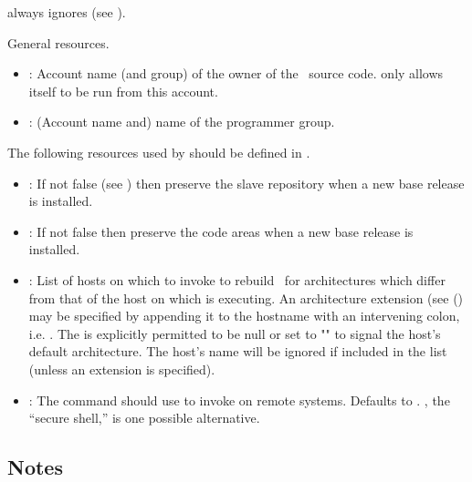  always ignores  (see ).

\noindent
General resources.

\begin{itemize}
\item
   : Account name (and group) of the owner of the
   \aipspp\ source code.   only allows itself to be run from this
   account.

\item
   : (Account name and) name of the \aipspp
   programmer group.
\end{itemize}

\noindent
The following resources used by  should be defined in
.

\begin{itemize}
\item
   : If not false (see ) then
   preserve the slave repository when a new base release is installed.

\item
   : If not false then preserve the code areas
   when a new base release is installed.

\item
   : List of hosts on which to invoke
    to rebuild \aipspp\ for architectures which differ from
   that of the host on which  is executing.  An architecture
   extension (see () may be specified by appending it to the
   hostname with an intervening colon, i.e. .
   The  is explicitly permitted to be null or set to
   "\code{\_}" to signal the host's default architecture.  The 
   host's name will be ignored if included in the list (unless an extension is
   specified).

\item
   : The command  should use
   to invoke  on remote systems.  Defaults to
   .  , the ``secure shell,'' is one possible
   alternative.
\end{itemize}

\subsection*{Notes}

